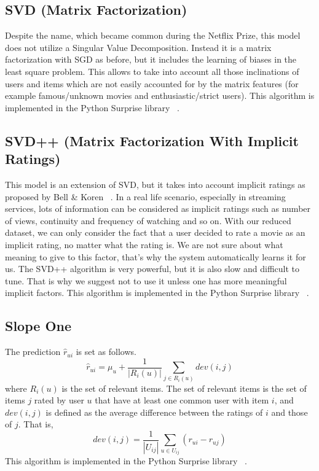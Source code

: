 \documentclass[10pt,conference,compsocconf]{IEEEtran}
\begin{document}
\subsection{SVD (Matrix Factorization)}
Despite the name, which became common during the Netflix Prize, this model does not utilize a Singular Value Decomposition. Instead it is a matrix factorization with SGD as before, but it includes the learning of biases in the least square problem. This allows to take into account all those inclinations of users and items which are not easily accounted for by the matrix features (for example famous/unknown movies and enthusiastic/strict users). This algorithm is implemented in the Python Surprise library ~\cite{Surprise}.
\subsection{SVD++ (Matrix Factorization With Implicit Ratings)}
This model is an extension of SVD, but it takes into account implicit ratings as proposed by Bell \& Koren ~\cite{koren2008factorization, koren2010factor}. In a real life scenario, especially in streaming services, lots of information can be considered as implicit ratings such as number of views, continuity and frequency of watching and so on. With our reduced dataset, we can only consider the fact that a user decided to rate a movie as an implicit rating, no matter what the rating is. We are not sure about what meaning to give to this factor, that's why the system automatically learns it for us. The SVD++ algorithm is very powerful, but it is also slow and difficult to tune. That is why we suggest not to use it unless one has more meaningful implicit factors. This algorithm is implemented in the Python Surprise library ~\cite{Surprise}.
\subsection{Slope One}
The prediction $\hat{r}_{ui}$ is set as follows.
\begin{equation}
\hat{r}_{ui} = \mu _u + \frac{1}{|R_{i}(u)|} \sum_{j \in R_{i}(u)}{}  dev(i, j)
\end{equation}
where $R_{i}(u)$ is the set of relevant items. The set of relevant items is the set of items $j$ rated by user $u$ that have at least one common user with item $i$, and $dev(i,j)$ is defined as the average difference between the ratings of $i$ and those of $j$. That is,
\begin{equation}
dev(i, j) = \frac{1}{|U_{ij}|} \sum_{u \in U_{ij}}{} (r_{ui} - r_{uj})
\end{equation}
This algorithm is implemented in the Python Surprise library ~\cite{Surprise}.
\end{document}
